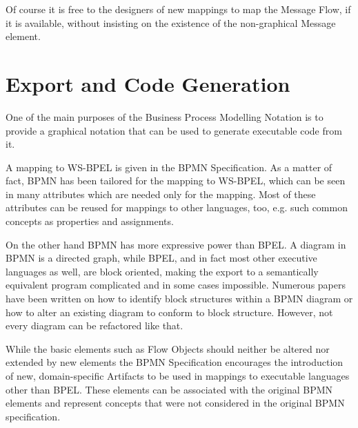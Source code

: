 Of course it is free to the designers of new mappings to map the Message Flow, if it is available,
without insisting on the existence of the non-graphical Message element.


\section{Export and Code Generation}
\label{sec:bpmn_export}

One of the main purposes of the Business Process Modelling Notation is to provide a graphical
notation that can be used to generate executable code from it.

A mapping to WS-BPEL is given in the BPMN Specification. As a matter of fact, BPMN has been tailored
for the mapping to WS-BPEL, which can be seen in many attributes which are needed only for the
mapping. Most of these attributes can be reused for mappings to other languages, too, e.g. such
common concepts as properties and assignments.

On the other hand BPMN has more expressive power than BPEL. A diagram in BPMN is a directed graph,
while BPEL, and in fact most other executive languages as well, are block oriented, making the
export to a semantically equivalent program complicated and in some cases impossible. Numerous
papers have been written on how to identify block structures within a BPMN diagram or how to alter
an existing diagram to conform to block structure. However, not every diagram can be refactored like
that.

While the basic elements such as Flow Objects should neither be altered nor extended by new elements
the BPMN Specification encourages the introduction of new, domain-specific Artifacts to be used in
mappings to executable languages other than BPEL. These elements can be associated with the original
BPMN elements and represent concepts that were not considered in the original BPMN specification.
